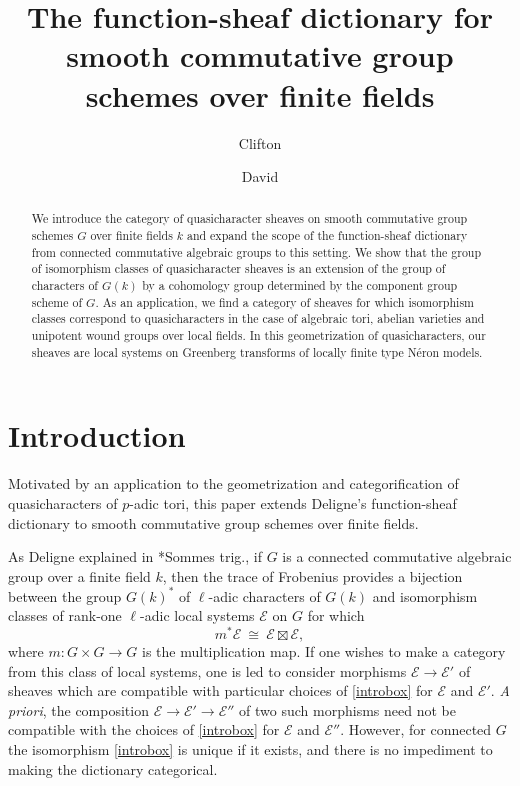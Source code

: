 \documentclass[CM,Submssn,SecEq]{degruyter-crelle} %
\title[The function-sheaf dictionary for smooth commutative group schemes]{The function-sheaf dictionary for smooth commutative group schemes over finite fields}
\author{Clifton}{Cunningham}{C.~Cunningham}{Calgary}
\author{David}{Roe}{D.~Roe}{Calgary}
\theoremstyle{plain}
\theoremstyle{definition}
\theoremstyle{remark}
\newcommand{\Fq}{k}
\newcommand{\iso}{{\ \cong\ }}
\newcommand{\qcs}[1]{{\mathcal{#1}}}
\begin{document}
\begin{abstract}
We introduce the category of quasicharacter sheaves on smooth commutative group schemes $G$ over finite fields $k$ and expand the scope of the function-sheaf dictionary from connected commutative algebraic groups to this setting.
We show that the group of isomorphism classes of quasicharacter sheaves is an extension of the group of characters of $G(k)$ by a cohomology group determined by the component group scheme of $G$.
As an application, we find a category of sheaves for which isomorphism classes correspond to quasi\-characters in the case of algebraic tori, abelian varieties and unipotent wound groups over local fields. 
In this geometrization of quasicharacters, our sheaves are local systems on
Greenberg transforms of locally finite type N\'eron models.
\end{abstract}



\section*{Introduction}


Motivated by an application to the geometrization and categorification of quasicharacters of $p$-adic tori,
this paper extends Deligne's function-sheaf dictionary to smooth commutative group schemes over finite fields. 

As Deligne explained in \cite{deligne:SGA4.5}*{Sommes trig.}, if $G$ is a connected commutative algebraic group over a finite field $k$, then the trace of Frobenius provides a bijection between the group $G(\Fq)^*$ of $\ell$-adic characters of $G(\Fq)$ and isomorphism classes of rank-one $\ell$-adic local systems $\mathcal{E}$ on $G$ for which 
\begin{equation}\label{introbox}
m^* \qcs{E} \iso \qcs{E} \boxtimes \qcs{E},%
\end{equation}
where $m : G\times G\to G$ is the multiplication map.
%
If one wishes to make a category from this class of local systems, one is led to consider morphisms $\qcs{E} \to \qcs{E}'$ of sheaves which are compatible with particular choices of \eqref{introbox} for $\qcs{E}$ and $\qcs{E'}$. 
{\it A priori}, the composition $\qcs{E} \to \qcs{E}' \to \qcs{E}''$ of two such morphisms need not be compatible with the choices of \eqref{introbox} for $\qcs{E}$ and $\qcs{E}''$. %
 However, for connected $G$ the isomorphism \eqref{introbox} is unique if it exists, and there is no impediment to making the dictionary categorical.
\end{document}
